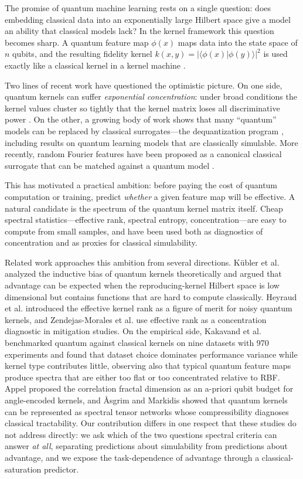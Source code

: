 \documentclass[a4paper,unpublished,onecolumn,nopdfoutputerror,12pt]{quantumarticle}
\begin{document}
The promise of quantum machine learning rests on a single question: does embedding
classical data into an exponentially large Hilbert space give a model an ability that
classical models lack? In the kernel framework this question becomes sharp. A quantum
feature map $\phi(x)$ maps data into the state space of $n$ qubits, and the resulting
fidelity kernel $k(x,y)=|\langle\phi(x)|\phi(y)\rangle|^2$ is used exactly like a classical
kernel in a kernel machine \cite{schuld2019,havlicek2019}.

Two lines of recent work have questioned the optimistic picture. On one side, quantum
kernels can suffer \emph{exponential concentration}: under broad conditions the kernel
values cluster so tightly that the kernel matrix loses all discriminative power
\cite{thanasilp2024}. On the other, a growing body of work shows that many
``quantum'' models can be replaced by classical surrogates---the dequantization program
\cite{shin2024,sweke2025}, including results on quantum learning models that are
classically simulable. More recently, random Fourier features have been proposed as a
canonical classical surrogate that can be matched against a quantum model
\cite{thabet2026}.

This has motivated a practical ambition: before paying the cost of quantum
computation or training, predict \emph{whether} a given feature map will be effective.
A natural candidate is the spectrum of the quantum kernel matrix itself. Cheap spectral
statistics---effective rank, spectral entropy, concentration---are easy to compute from
small samples, and have been used both as diagnostics of concentration and as proxies for
classical simulability.

Related work approaches this ambition from several directions. K\"ubler et al.
\cite{kubler2021} analyzed the inductive bias of quantum kernels theoretically and
argued that advantage can be expected when the reproducing-kernel Hilbert space is low
dimensional but contains functions that are hard to compute classically. Heyraud et al.
\cite{heyraud2022} introduced the effective kernel rank as a figure of merit for noisy
quantum kernels, and Zendejas-Morales et al. \cite{zendejas2026} use effective rank as a
concentration diagnostic in mitigation studies. On the empirical side, Kakavand et al.
\cite{kakavand2026} benchmarked quantum against classical kernels on nine datasets with
970 experiments and found that dataset choice dominates performance variance while kernel
type contributes little, observing also that typical quantum feature maps produce spectra
that are either too flat or too concentrated relative to RBF. Appel \cite{appel2026}
proposed the correlation fractal dimension as an a-priori qubit budget for angle-encoded
kernels, and \AA{}sgrim and Markidis \cite{asgrim2026} showed that quantum kernels can be
represented as spectral tensor networks whose compressibility diagnoses classical
tractability. Our contribution differs in one respect that these studies do not address
directly: we ask which of the two questions spectral criteria can answer \emph{at all},
separating predictions about simulability from predictions about advantage, and we expose
the task-dependence of advantage through a classical-saturation predictor.
\end{document}
